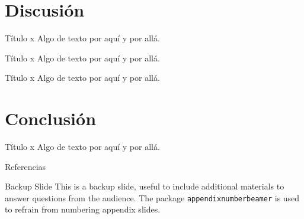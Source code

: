\documentclass{beamer}
\begin{document}

\section{Discusión}

\begin{frame}{Título x}
	Algo de texto por aquí y por allá.
\end{frame}

\begin{frame}{Título x}
	Algo de texto por aquí y por allá.
\end{frame}

\begin{frame}{Título x}
	Algo de texto por aquí y por allá.
\end{frame}


\section{Conclusión}

\begin{frame}{Título x}
	Algo de texto por aquí y por allá.
\end{frame}


\appendix

\begin{frame}[allowframebreaks]{Referencias}
	
	
	
\end{frame}


\begin{frame}{Backup Slide}
	This is a backup slide, useful to include additional materials to answer questions from the audience.
	\vfill
	The package \texttt{appendixnumberbeamer} is used to refrain from numbering appendix slides.
\end{frame}

\end{document}
